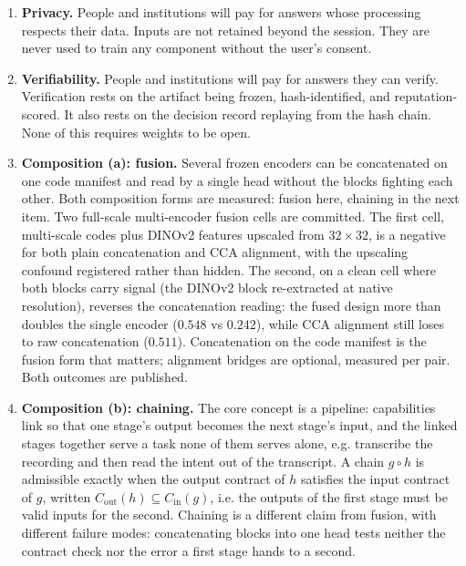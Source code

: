 \documentclass[11pt]{article}
\begin{document}
\begin{enumerate}
    \item \textbf{Privacy.} People and institutions will pay for
          answers whose processing respects their data. Inputs are not
          retained beyond the session. They are never used to train any
          component without the user's consent.
    \item \textbf{Verifiability.} People and institutions will pay for
          answers they can verify. Verification rests on the artifact being
          frozen, hash-identified, and reputation-scored. It also rests on
          the decision record replaying from the hash chain. None of this
          requires weights to be open.
    \item \textbf{Composition (a): fusion.} Several frozen encoders can
          be concatenated on one code manifest and read by a single head
          without the blocks fighting each other. Both composition forms are
          measured: fusion here, chaining in the next item. Two
          full-scale multi-encoder fusion cells are committed. The first cell, multi-scale codes plus DINOv2 features upscaled from
          $32\times32$, is a negative for both plain concatenation and CCA
          alignment, with the upscaling confound registered rather than
          hidden. The second, on a clean cell where both blocks carry signal
          (the DINOv2 block re-extracted at native resolution), reverses the
          concatenation reading: the fused design more than doubles the
          single encoder ($0.548$ vs $0.242$), while CCA alignment still
          loses to raw concatenation ($0.511$). Concatenation on the code
          manifest is the fusion form that matters; alignment bridges are
          optional, measured per pair. Both outcomes are published.

    \item \textbf{Composition (b): chaining.} The core concept is a
          pipeline: capabilities link so that one stage's output becomes the
          next stage's input, and the linked stages together serve a task
          none of them serves alone, e.g. transcribe the recording and then
          read the intent out of the transcript. A chain
          $g \circ h$ is admissible exactly when the output contract of $h$
          satisfies the input contract of $g$, written
          $C_{\mathrm{out}}(h) \subseteq C_{\mathrm{in}}(g)$, i.e. the outputs
          of the first stage must be valid inputs for the second. Chaining
          is a different claim from fusion, with different failure modes:
          concatenating blocks into one head tests neither the contract
          check nor the error a first stage hands to a second.


\end{enumerate}
\end{document}

